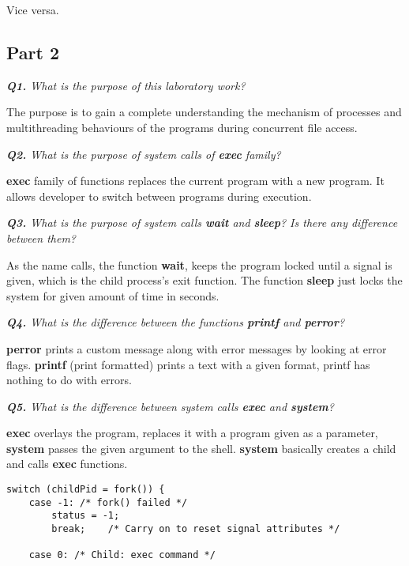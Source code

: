 \documentclass[11pt]{article}
\begin{document}
Vice versa.

\subsection*{Part 2}

\textit{\textbf{Q1.} What is the purpose of this laboratory work?}
\vspace{3mm}

The purpose is to gain a complete understanding the mechanism of processes and multithreading behaviours of the programs during concurrent file access.

\vspace{3mm}
\textit{\textbf{Q2.} What is the purpose of system calls of \textbf{exec} family?}
\vspace{3mm}

\textbf{exec} family of functions replaces the current program with a new program. It allows developer to switch between programs during execution.

\vspace{5mm}
\textit{\textbf{Q3.} What is the purpose of system calls \textbf{wait} and \textbf{sleep}? Is there any difference between them?}
\vspace{5mm}

As the name calls, the function \textbf{wait}, keeps the program locked until a signal is given, which is the child process's exit function. The function \textbf{sleep} just locks the system for given amount of time in seconds.

\vspace{5mm}
\textit{\textbf{Q4.} What is the difference between the functions \textbf{printf} and \textbf{perror}?}
\vspace{5mm}

\textbf{perror} prints a custom message along with error messages by looking at error flags. \textbf{printf} (print formatted) prints a text with a given format, printf has nothing to do with errors.

\vspace{5mm}
\textit{\textbf{Q5.} What is the difference between system calls \textbf{exec} and \textbf{system}?}
\vspace{5mm}

\textbf{exec} overlays the program, replaces it with a program given as a parameter, \textbf{system} passes the given argument to the shell. \textbf{system} basically creates a child and calls \textbf{exec} functions.

\begin{minipage}{1\textwidth}
\begin{lstlisting}[title=procexec/system.c - The Linux Programming Interface \text{(Listing 27-9, page 586)}, frame=tlrb]
switch (childPid = fork()) {
    case -1: /* fork() failed */
        status = -1;
        break;    /* Carry on to reset signal attributes */

    case 0: /* Child: exec command */
 \end{lstlisting}
\end{minipage}
\end{document}
